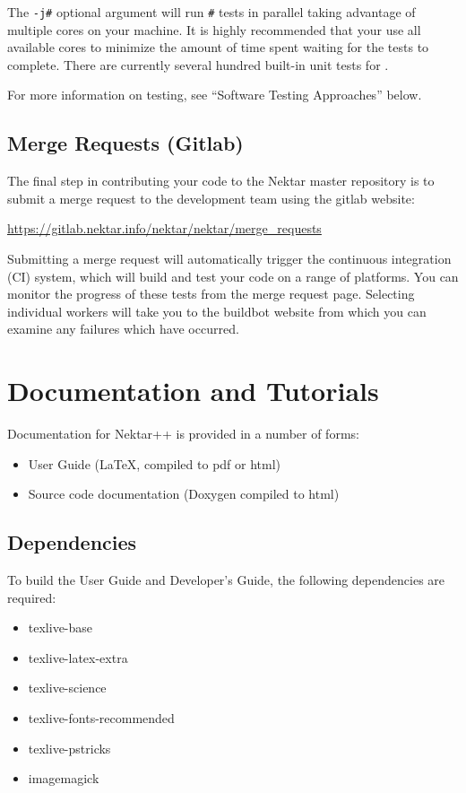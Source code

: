 The \lstinline{-j#} optional argument will run \lstinline{#} tests in parallel
taking advantage of multiple cores on your machine.  It is highly
recommended that your use all available cores to minimize the amount
of time spent waiting for the tests to complete. There are currently
several hundred built-in unit tests for {\nek}.

For more information on testing, see ``Software Testing Approaches'' below.

\subsection{Merge Requests (Gitlab)}
The final step in contributing your code to the
Nektar master repository is to submit a merge request to the
development team using the {\nek} gitlab website:
  
\url{https://gitlab.nektar.info/nektar/nektar/merge\_requests}
  
Submitting a merge request will automatically trigger the continuous integration (CI) system, which will build and test your code on a range of platforms. You can monitor the progress of these tests from the merge request page. Selecting individual workers will take you to the buildbot website from which you can examine any failures which have occurred.
  

\section{Documentation and Tutorials}

Documentation for Nektar++ is provided in a number of forms:
\begin{itemize}
    \item User Guide (LaTeX, compiled to pdf or html)
    \item Source code documentation (Doxygen compiled to html)
\end{itemize}

\subsection{Dependencies}
To build the User Guide and Developer's Guide, the following dependencies are required:
\begin{itemize}
    \item texlive-base
    \item texlive-latex-extra
    \item texlive-science
    \item texlive-fonts-recommended
    \item texlive-pstricks
    \item imagemagick
\end{itemize}


